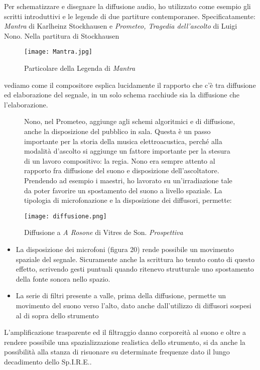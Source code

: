 Per schematizzare e disegnare la diffusione audio, ho utilizzato come esempio gli scritti introduttivi e le legende di due partiture contemporanee. Specificatamente: \textit{Mantra} di Karlheinz Stockhausen e \textit{Prometeo, Tragedia dell'ascolto} di Luigi Nono. Nella partitura di Stockhausen \begin{figure}[!htbp]
\begin{center}
\texttt{[image: Mantra.jpg]}
\caption{Particolare della Legenda di \textit{Mantra}}
\label{default}
\end{center}
\end{figure}
vediamo come il compositore esplica lucidamente il rapporto che c'è tra diffusione ed elaborazione del segnale, in un solo schema racchiude sia la diffusione che l'elaborazione.\begin{figure}[htbp]
Nono, nel Prometeo, aggiunge agli schemi algoritmici e di diffusione, anche la disposizione del pubblico in sala. Questa è un passo importante per la storia della musica elettroacustica, perché alla modalità d'ascolto si aggiunge un fattore importante per la stesura di un lavoro compositivo: la regia. Nono era sempre attento al rapporto fra diffusione del suono e disposizione dell'ascoltatore.
Prendendo ad esempio i maestri, ho lavorato su un'irradiazione tale da poter favorire un spostamento del suono a livello spaziale. La tipologia di microfonazione e la disposizione dei diffusori, permette:
\begin{center}
\texttt{[image: diffusione.png]}
\caption{Diffusione a \textit{A Rosone} di Vitres de Son. \textit{Prospettiva}}
\label{default}
\end{center}
\end{figure}

\begin{itemize}
\item{La disposizione dei microfoni (figura 20) rende possibile un movimento spaziale del segnale. Sicuramente anche la scrittura ho tenuto conto di questo effetto, scrivendo gesti puntuali quando ritenevo strutturale uno spostamento della fonte sonora nello spazio.}
\item{La serie di filtri presente a valle, prima della diffusione, permette un movimento del suono verso l'alto, dato anche dall'utilizzo di diffusori sospesi al di sopra dello strumento}
\end{itemize}

L'amplificazione trasparente ed il filtraggio danno corporeità al suono e oltre a rendere possibile una spazializzazione realistica dello strumento, si da anche la possibilità alla stanza di risuonare su determinate frequenze dato il lungo decadimento dello Sp.I.R.E..
